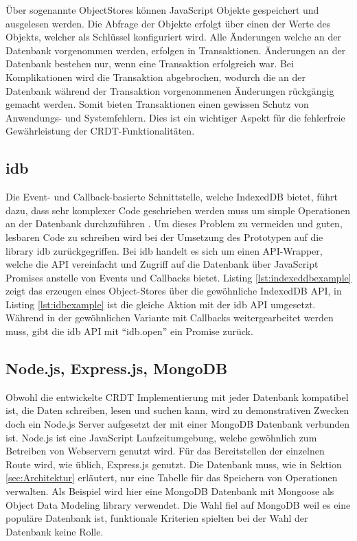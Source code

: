 \documentclass[a4paper, 12pt]{scrreprt}
\begin{document}
Über sogenannte ObjectStores können JavaScript Objekte gespeichert und ausgelesen werden. Die Abfrage der Objekte erfolgt über einen der Werte des Objekts, welcher als Schlüssel konfiguriert wird. Alle Änderungen welche an der Datenbank vorgenommen werden, erfolgen in Transaktionen. Änderungen an der Datenbank bestehen nur, wenn eine Transaktion erfolgreich war. Bei Komplikationen wird die Transaktion abgebrochen, wodurch die an der Datenbank während der Transaktion vorgenommenen Änderungen rückgängig gemacht werden. Somit bieten Transaktionen einen gewissen Schutz von Anwendungs- und Systemfehlern. Dies ist ein wichtiger Aspekt für die fehlerfreie Gewährleistung der CRDT-Funktionalitäten.
\subsection{idb}
Die Event- und Callback-basierte Schnittstelle, welche IndexedDB bietet, führt dazu, dass sehr komplexer Code geschrieben werden muss um simple Operationen an der Datenbank durchzuführen \autocite{InproceedingsIDBdoof}. Um dieses Problem zu vermeiden und guten, lesbaren Code zu schreiben wird bei der Umsetzung des Prototypen auf die library idb zurückgegriffen. Bei idb handelt es sich um einen API-Wrapper, welche die API vereinfacht und Zugriff auf die Datenbank über JavaScript Promises anstelle von Events und Callbacks bietet. Listing \ref{lst:indexeddbexample} zeigt das erzeugen eines Object-Stores über die gewöhnliche IndexedDB API, in Listing \ref{lst:idbexample} ist die gleiche Aktion mit der idb API umgesetzt. Während in der gewöhnlichen Variante mit Callbacks weitergearbeitet werden muss, gibt die idb API mit \enquote{idb.open} ein Promise zurück.




	
\subsection{Node.js, Express.js, MongoDB}

Obwohl die entwickelte CRDT Implementierung mit jeder Datenbank kompatibel ist, die Daten schreiben, lesen und suchen kann, wird zu demonstrativen Zwecken doch ein Node.js Server aufgesetzt der mit einer MongoDB Datenbank verbunden ist. Node.js ist eine JavaScript Laufzeitumgebung, welche gewöhnlich zum Betreiben von Webservern genutzt wird. Für das Bereitstellen der einzelnen Route wird, wie üblich, Express.js genutzt. Die Datenbank muss, wie in Sektion \ref{sec:Architektur} erläutert, nur eine Tabelle für das Speichern von Operationen verwalten. Als Beispiel wird hier eine MongoDB Datenbank mit Mongoose als Object Data Modeling library verwendet. Die Wahl fiel auf MongoDB weil es eine populäre Datenbank ist, funktionale Kriterien spielten bei der Wahl der Datenbank keine Rolle. 
\end{document}
